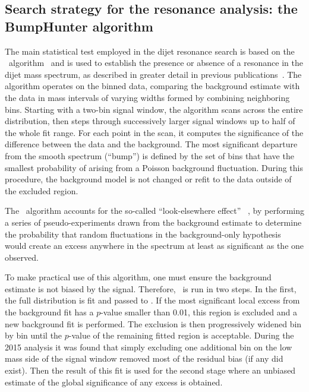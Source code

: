 \label{sec:searchstrategy}

\subsection{Search strategy for the resonance analysis: the BumpHunter algorithm}

The main statistical test employed in the dijet resonance search is based
on the \BumpHunter\ algorithm~\cite{Aaltonen:2008vt,Choudalakis:2011bh} and 
is used to establish the presence or absence of a resonance in the dijet
mass spectrum, as described in greater detail in previous 
publications~\cite{EXOT-2010-07,EXOT-2011-07}. 
The algorithm operates on the binned \mjj data, comparing the background estimate with the data in mass intervals of 
varying widths formed by combining neighboring bins. Starting with a two-bin signal window,
the algorithm scans across the entire distribution, 
then steps through successively larger signal windows up to half of the whole fit range. 
For each point in the scan, it computes the significance of the difference between the data and the background.
The most significant departure from the smooth spectrum
(``bump'') is defined by the set of bins that have the smallest probability
of arising from a Poisson background fluctuation.
During this procedure, the background model is not changed or refit to the data
outside of the excluded region.

The \BumpHunter\ algorithm accounts for the so-called ``look-elsewhere effect'' 
~\cite{lyons2008, Gross2010}, by performing a series of pseudo-experiments
drawn from the background estimate to determine the probability that random
fluctuations in the background-only hypothesis would create an excess 
anywhere in the spectrum at least as significant as the one observed.

To make practical use of this algorithm, one must ensure the background
estimate is not biased by the signal.
Therefore, \BumpHunter\ is run in two steps.  In the first, the full
distribution is fit and passed to \BumpHunter.
If the most significant local excess from the background fit has a $p$-value
smaller than 0.01, this region is excluded and a new background fit is
performed. The exclusion is then progressively widened bin by bin until
the $p$-value of the remaining fitted region is acceptable.  
During the 2015 analysis it was found that simply excluding one additional bin on the low mass
side of the signal window removed most of the residual bias (if any
did exist).  Then the result of this fit is used for the second
stage where an unbiased estimate of the global significance of any
excess is obtained.
